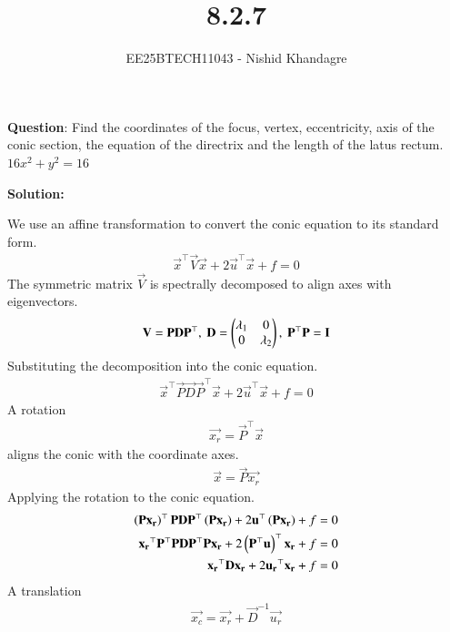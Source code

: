 \documentclass[journal]{IEEEtran}
\title{8.2.7}
\author{EE25BTECH11043 - Nishid Khandagre}
\begin{document}
\maketitle

\renewcommand{\thefigure}{\theenumi}
\renewcommand{\thetable}{\theenumi}


\textbf{Question}:
Find the coordinates of the focus, vertex, eccentricity, axis of the conic section, the equation of the directrix and the length of the latus rectum. 
$16x^2 + y^2 = 16$

\textbf{Solution:}

We use an affine transformation to convert the conic equation to its standard form.
\begin{align}
    \vec{x}^\top\vec{V}\vec{x} + 2\vec{u}^\top\vec{x} + f = 0
\end{align}
The symmetric matrix $\vec{V}$ is spectrally decomposed to align axes with eigenvectors.
\begin{align}
    \mathbf{V} = \mathbf{P}\mathbf{D}\mathbf{P}^\top, \text{ } \mathbf{D} = \begin{pmatrix}\lambda_1 & 0 \\ 0 & \lambda_2\end{pmatrix}, \text{ } \mathbf{P}^\top\mathbf{P} = \mathbf{I}
\end{align}
Substituting the decomposition into the conic equation.
\begin{align}
    \vec{x}^\top\vec{P}\vec{D}\vec{P}^\top\vec{x} + 2\vec{u}^\top\vec{x} + f = 0
\end{align}
A rotation
\begin{align}
    \vec{x_r} = \vec{P}^\top\vec{x} 
\end{align}
aligns the conic with the coordinate axes.
\begin{align}
    \vec{x} = \vec{P}\vec{x_r}
\end{align}
Applying the rotation to the conic equation.
\begin{align}
    \left(\mathbf{P}\mathbf{x_r}\right)^\top\mathbf{P}\mathbf{D}\mathbf{P}^\top\left(\mathbf{P}\mathbf{x_r}\right) + 2\mathbf{u}^\top\left(\mathbf{P}\mathbf{x_r}\right) + f &= 0 \\
    \mathbf{x_r}^\top\mathbf{P}^\top\mathbf{P}\mathbf{D}\mathbf{P}^\top\mathbf{P}\mathbf{x_r} + 2\left(\mathbf{P}^\top\mathbf{u}\right)^\top\mathbf{x_r} + f &= 0 \\
    \mathbf{x_r}^\top\mathbf{D}\mathbf{x_r} + 2\mathbf{u_r}^\top\mathbf{x_r} + f &= 0
\end{align}
A translation 
\begin{align}
    \vec{x_c} = \vec{x_r} + \vec{D}^{-1}\vec{u_r}
\end{align}
\end{document}

